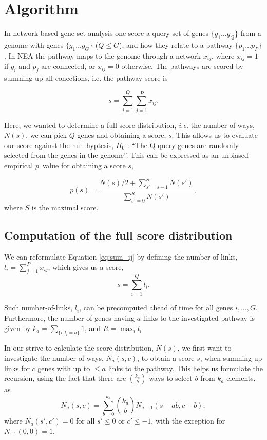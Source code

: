 \documentclass[a4paper,american]{lipics-v2016}
\begin{document}
\section*{Algorithm}


In network-based gene set analysis one score a query set of genes $ \{g_1 \ldots g_Q\} $ from a genome with genes $\{g_1 \ldots g_G\}$ ($Q \le G$), and how they relate to a pathway $\{p_1 \ldots p_P\}$. In NEA the pathway maps to the genome through a network ${x_{ij}}$, where $x_{ij}=1$ if $g_i$ and $p_j$ are connected, or $x_{ij}=0$ otherwise. The pathways are scored by summing up all conections, i.e. the pathway score is

\begin{equation}
s=\sum_{i=1}^Q\sum_{j=1}^P x_{ij}.
\label{eq:sum_ij}
\end{equation}

Here, we wanted to determine a full score distribution, {\em i.e.} the number of ways, $N(s)$, we can pick $Q$ genes and obtaining a score, $s$. This allows us to evaluate our score against the null hyptesis, $H_0$ : ``The Q query genes are randomly selected from the genes in the genome''. This can be expressed as an unbiased empirical $p$~value for obtaining a score $s$,

\begin{equation}
p(s)=\frac{N(s)/2 +\sum_{s'=s+1}^{S} N(s')}{\sum_{s'=0}^{S} N(s')},
\label{eq:pval}
\end{equation}
where $S$ is the maximal score.

\subsection*{Computation of the full score distribution}

We can reformulate Equation \ref{eq:sum_ij} by defining the number-of-links, $l_i=\sum_{j=1}^P x_{ij}$, which gives us a score,
\begin{equation}
s=\sum_{i=1}^Q l_i.
\label{eq:sum_i}
\end{equation}

Such number-of-links, $l_i$, can be precomputed ahead of time for all genes $i, \ldots, G$.
Furthermore, the number of genes having $a$ links to the investigated pathway is given by $k_a=\sum_{\{i:l_i=a\}}1$, and $R=\max_{i}{l_i}$.

In our strive to calculate the score distribution, $N(s)$, we first want to investigate the number of ways, $N_a(s,c)$, to obtain a score $s$, when summing up links for $c$ genes with up to $\le a$ links to the pathway. This helps us formulate the recursion, using the fact that there are $k_a \choose b$ ways to select $b$ from $k_a$ elements, as
\begin{equation}
N_a(s,c)=\sum_{b=0}^{k_a}{k_a \choose b} N_{a-1}(s-ab,c-b),
\end{equation}
where $N_a(s',c')=0$ for all $s'\le 0$ or $c' \le -1$, with the exception for $N_{-1}(0,0)=1$.
\end{document}
